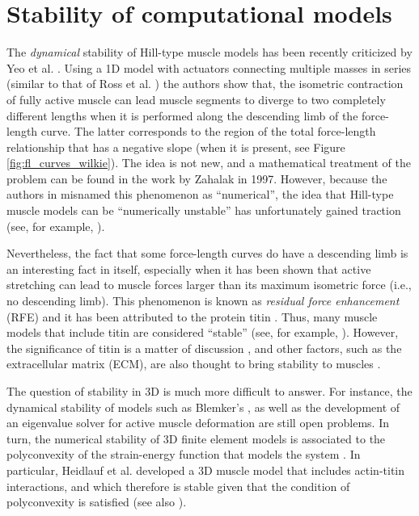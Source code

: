 \documentclass{sfuthesis}
\numberwithin{equation}{section}
\numberwithin{figure}{chapter}
\numberwithin{table}{chapter}
\theoremstyle{definition}
\begin{document}
\section{Stability of computational models}

The \textit{dynamical} stability of Hill-type muscle models has been recently criticized by Yeo et al. \cite{YeoEtAl2023NumericalInstability}. Using a 1D model with actuators connecting multiple masses in series (similar to that of Ross et al. \cite{Ross2018-1D}) the authors show that, the isometric contraction of fully active muscle can lead muscle segments to diverge to two completely different lengths when it is performed along the descending limb of the force-length curve. The latter corresponds to the region of the total force-length relationship that has a negative slope (when it is present, see Figure \ref{fig:fl_curves_wilkie}). The idea is not new, and a mathematical treatment of the problem can be found in the work by Zahalak \cite{Zahalak1997} in 1997. However, because the authors in \cite{YeoEtAl2023NumericalInstability} misnamed this phenomenon as ``numerical'', the idea that Hill-type muscle models can be ``numerically unstable'' has unfortunately gained traction (see, for example, \cite{Mendoza2025,SampaioDeOliveiraUchida2025}). 

Nevertheless, the fact that some force-length curves do have a descending limb is an interesting fact in itself, especially when it has been shown that active stretching can lead to muscle forces larger than its maximum isometric force (i.e., no descending limb). This phenomenon is known as \textit{residual force enhancement} (RFE) \cite{HerzogLeonard2002} and it has been attributed to the protein titin \cite{Herzog2014Titin}. Thus, many muscle models that include titin are considered ``stable'' (see, for example, \cite{HeidlaufEtAl2017,Millard2024,SampaioDeOliveiraUchida2025}). However, the significance of titin is a matter of discussion \cite{Lieber2018NotTitin}, and other factors, such as the extracellular matrix (ECM), are also thought to bring stability to muscles \cite{GilliesLieber2011ECM}.

The question of stability in 3D is much more difficult to answer. For instance, the dynamical stability of models such as Blemker's \cite{BlemkerPinskyDelp2005}, as well as the development of an eigenvalue solver for active muscle deformation are still open problems. In turn, the numerical stability of 3D finite element models is associated to the polyconvexity of the strain-energy function that models the system \cite{SchroderNeff2003}. In particular, Heidlauf et al. \cite{HeidlaufEtAl2017} developed a 3D muscle model that includes actin-titin interactions, and which therefore is stable given that the condition of polyconvexity is satisfied (see also \cite{SampaioDeOliveiraUchida2025}).
\end{document}
